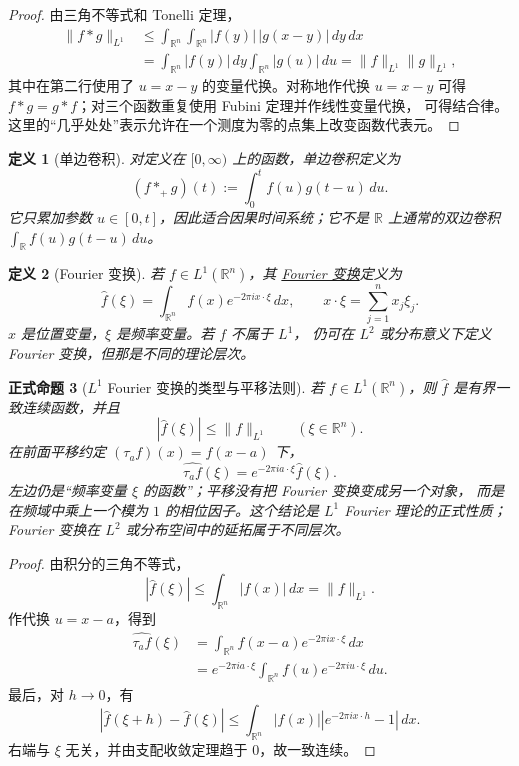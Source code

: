 \documentclass[UTF8,fontset=none,a4paper,11pt]{ctexart}
\theoremstyle{foundation-definition}
\newtheorem{definition}{定义}[section]
\theoremstyle{foundation-theorem}
\theoremstyle{foundation-proposition}
\newtheorem{proposition}[definition]{正式命题}
\theoremstyle{foundation-example}
\theoremstyle{foundation-remark}
\theoremstyle{foundation-theorem}
\newcommand{\term}[2]{\hyperref[#1]{#2}}
\begin{document}
\begin{proof}
由三角不等式和 Tonelli 定理，
\[
\begin{aligned}
\|f*g\|_{L^1}
&\leq \int_{\mathbb R^n}\int_{\mathbb R^n}
 |f(y)|\,|g(x-y)|\,dy\,dx\\
&=\int_{\mathbb R^n}|f(y)|\,dy
  \int_{\mathbb R^n}|g(u)|\,du
=\|f\|_{L^1}\|g\|_{L^1},
\end{aligned}
\]
其中在第二行使用了 \(u=x-y\) 的变量代换。对称地作代换
\(u=x-y\) 可得 \(f*g=g*f\)；对三个函数重复使用 Fubini 定理并作线性变量代换，
可得结合律。这里的“几乎处处”表示允许在一个测度为零的点集上改变函数代表元。
\end{proof}

\begin{definition}[单边卷积]\label{def:one-sided-convolution}
对定义在 \([0,\infty)\) 上的函数，单边卷积定义为
\[
(f*_{+}g)(t):=\int_0^t f(u)g(t-u)\,du.
\]
它只累加参数 \(u\in[0,t]\)，因此适合因果时间系统；它不是
\(\mathbb R\) 上通常的双边卷积 \(\int_{\mathbb R}f(u)g(t-u)\,du\)。
\end{definition}

\begin{definition}[Fourier 变换]\label{def:fourier-transform}
若 \(f\in L^1(\mathbb R^n)\)，其
\term{def:fourier-transform}{Fourier 变换}定义为
\[
\widehat f(\xi)=\int_{\mathbb R^n}f(x)e^{-2\pi i x\cdot\xi}\,dx,
\qquad x\cdot\xi=\sum_{j=1}^nx_j\xi_j.
\]
\(x\) 是位置变量，\(\xi\) 是频率变量。若 \(f\) 不属于 \(L^1\)，
仍可在 \(L^2\) 或分布意义下定义 Fourier 变换，但那是不同的理论层次。
\end{definition}

\begin{proposition}[\(L^1\) Fourier 变换的类型与平移法则]\label{prop:fourier-l1-properties}
若 \(f\in L^1(\mathbb R^n)\)，则 \(\widehat f\) 是有界一致连续函数，并且
\[
|\widehat f(\xi)|\leq\|f\|_{L^1}\qquad(\xi\in\mathbb R^n).
\]
在前面平移约定 \((\tau_a f)(x)=f(x-a)\) 下，
\[
\widehat{\tau_a f}(\xi)
=e^{-2\pi i a\cdot\xi}\widehat f(\xi).
\]
左边仍是“频率变量 \(\xi\) 的函数”；平移没有把 Fourier 变换变成另一个对象，
而是在频域中乘上一个模为 \(1\) 的相位因子。这个结论是 \(L^1\) Fourier 理论的正式性质；
Fourier 变换在 \(L^2\) 或分布空间中的延拓属于不同层次。
\end{proposition}

\begin{proof}
由积分的三角不等式，
\[
|\widehat f(\xi)|
\leq\int_{\mathbb R^n}|f(x)|\,dx=\|f\|_{L^1}.
\]
作代换 \(u=x-a\)，得到
\[
\begin{aligned}
\widehat{\tau_a f}(\xi)
&=\int_{\mathbb R^n}f(x-a)e^{-2\pi i x\cdot\xi}\,dx\\
&=e^{-2\pi i a\cdot\xi}
  \int_{\mathbb R^n}f(u)e^{-2\pi i u\cdot\xi}\,du.
\end{aligned}
\]
最后，对 \(h\to0\)，有
\[
|\widehat f(\xi+h)-\widehat f(\xi)|
\leq\int_{\mathbb R^n}|f(x)|
  |e^{-2\pi i x\cdot h}-1|\,dx.
\]
右端与 \(\xi\) 无关，并由支配收敛定理趋于 \(0\)，故一致连续。
\end{proof}
\end{document}
